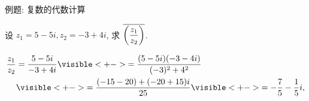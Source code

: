 \begin{frame}[<*>]{例题: 复数的代数计算}
\onslide<+->
\begin{example}
设 $z_1=5-5i,z_2=-3+4i$, 求 $\overline{\left(\dfrac{z_1}{z_2}\right)}$.
\end{example}
\onslide<+->
\begin{solution}
\vspace{-\baselineskip}
\begin{align*}
\frac{z_1}{z_2}&=\frac{5-5i}{-3+4i}
\visible<+->{=\frac{(5-5i)(-3-4i)}{(-3)^2+4^2}}\\
&\visible<+->{=\frac{(-15-20)+(-20+15)i}{25}}
\visible<+->{=-\frac75-\frac15i,}
\end{align*}
\end{solution}
\end{frame}


